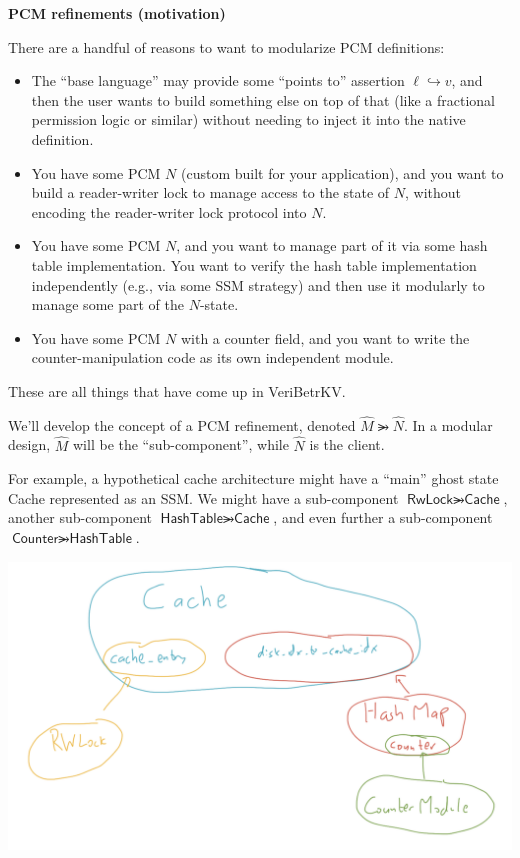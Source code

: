 \documentclass{article}
\newcommand{\pointsto}{\hookrightarrow}
\newcommand{\refines}{\rightarrowgtr}
\begin{document}
\textbf{PCM refinements (motivation)}

There are a handful of reasons to want to modularize PCM definitions:
\begin{itemize}
  \item The ``base language'' may provide some ``points to'' assertion $\ell \pointsto v$,
    and then the user wants to build something else on top of that (like a fractional permission logic or similar) without needing to inject it into the native definition.
  \item You have some PCM $N$ (custom built for your application), and you want to build a reader-writer lock to manage
    access to the state of $N$, without encoding the reader-writer lock protocol into $N$.
  \item You have some PCM $N$, and you want to manage part of it via some hash table implementation. You want to verify the hash table implementation independently (e.g., via some SSM strategy) and then use it modularly to manage some part of the $N$-state.
  \item You have some PCM $N$ with a counter field, and you want to write the counter-manipulation code as its own independent module.
\end{itemize}
These are all things that have come up in VeriBetrKV.

We'll develop the concept of a PCM refinement, denoted $\widehat{M} \refines \widehat{N}$.
In a modular design, $\widehat{M}$ will be the ``sub-component'', while $\widehat{N}$
is the client.

For example, a hypothetical cache architecture might have a ``main'' ghost state \textsf{Cache}
represented as an SSM.
We might have a sub-component $\textsf{RwLock} \refines \textsf{Cache}$,
another sub-component $\textsf{HashTable} \refines \textsf{Cache}$,
and even further a sub-component $\textsf{Counter} \refines \textsf{HashTable}$.

\begin{center}
\includegraphics[scale=0.3]{hypothetical-cache-architecture.png}
\end{center}
\end{document}

